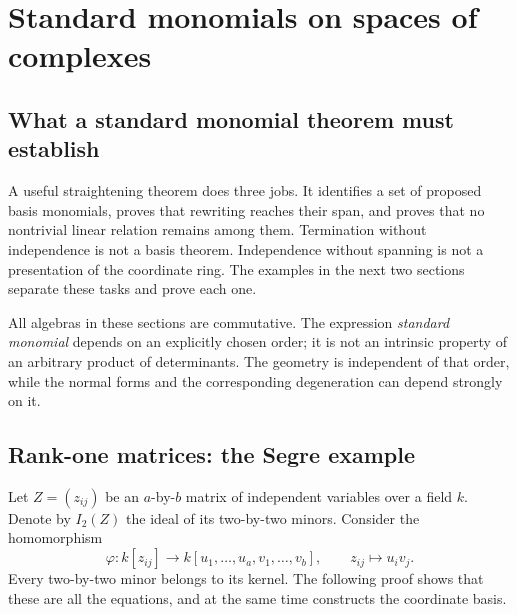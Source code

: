 \chapter{Standard monomials on spaces of complexes}
\label{chap:standard-complexes}

\section{What a standard monomial theorem must establish}

A useful straightening theorem does three jobs.  It identifies a
set of proposed basis monomials, proves that rewriting reaches
their span, and proves that no nontrivial linear relation remains
among them.  Termination without independence is not a basis
theorem.  Independence without spanning is not a presentation of
the coordinate ring.  The examples in the next two sections
separate these tasks and prove each one.

All algebras in these sections are commutative.  The expression
\emph{standard monomial} depends on an explicitly chosen order;
it is not an intrinsic property of an arbitrary product of
determinants.  The geometry is independent of that order,
while the normal forms and the corresponding degeneration
can depend strongly on it.

\section{Rank-one matrices: the Segre example}

Let \(Z=(z_{ij})\) be an \(a\)-by-\(b\) matrix of independent
variables over a field \(k\).  Denote by \(I_2(Z)\) the ideal
of its two-by-two minors.  Consider the homomorphism
\[
 \varphi:k[z_{ij}]\longrightarrow k[u_1,\ldots,u_a,v_1,\ldots,v_b],
 \qquad z_{ij}\longmapsto u_i v_j.
\]
Every two-by-two minor belongs to its kernel.  The following
proof shows that these are all the equations, and at the
same time constructs the coordinate basis.

